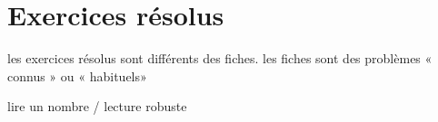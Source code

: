 \chapter{Exercices résolus}

\minitoc



les exercices résolus sont différents des fiches. les fiches sont des problèmes « connus » ou « habituels» 

lire un nombre / lecture robuste


